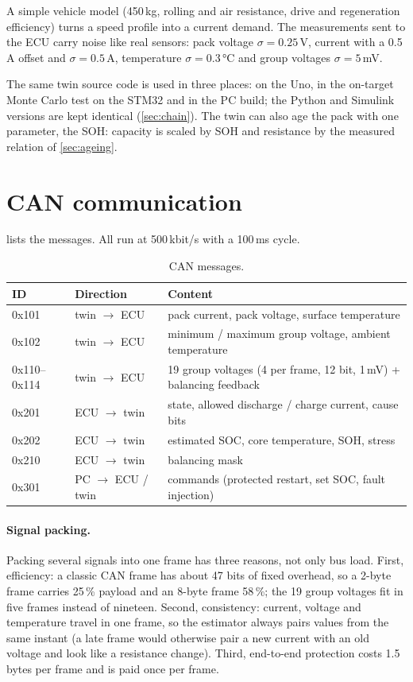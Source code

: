 A simple vehicle model (450\,kg, rolling and air resistance, drive and regeneration efficiency) turns a speed profile into a current demand. The measurements sent to the ECU carry noise like real sensors: pack voltage $\sigma = 0.25$\,V, current with a 0.5\,A offset and $\sigma = 0.5$\,A, temperature $\sigma = 0.3$\,°C and group voltages $\sigma = 5$\,mV.

The same twin source code is used in three places: on the Uno, in the on-target Monte Carlo test on the STM32 and in the PC build; the Python and Simulink versions are kept identical (\cref{sec:chain}). The twin can also age the pack with one parameter, the SOH: capacity is scaled by SOH and resistance by the measured relation of \cref{sec:ageing}.


\section{CAN communication}\label{sec:can}
 lists the messages. All run at 500\,kbit/s with a 100\,ms cycle.

\begin{table}[htbp]\centering\small
\caption{CAN messages.}\label{tab:can}
\begin{tabular}{@{}lll@{}}\toprule
ID & Direction & Content \\\midrule
0x101 & twin $\to$ ECU & pack current, pack voltage, surface temperature \\
0x102 & twin $\to$ ECU & minimum / maximum group voltage, ambient temperature \\
0x110--0x114 & twin $\to$ ECU & 19 group voltages (4 per frame, 12 bit, 1\,mV) + balancing feedback \\
0x201 & ECU $\to$ twin & state, allowed discharge / charge current, cause bits \\
0x202 & ECU $\to$ twin & estimated SOC, core temperature, SOH, stress \\
0x210 & ECU $\to$ twin & balancing mask \\
0x301 & PC $\to$ ECU / twin & commands (protected restart, set SOC, fault injection) \\\bottomrule
\end{tabular}
\end{table}

\paragraph{Signal packing.} Packing several signals into one frame has three reasons, not only bus load. First, efficiency: a classic CAN frame has about 47 bits of fixed overhead, so a 2-byte frame carries 25\,\% payload and an 8-byte frame 58\,\%; the 19 group voltages fit in five frames instead of nineteen. Second, consistency: current, voltage and temperature travel in one frame, so the estimator always pairs values from the same instant (a late frame would otherwise pair a new current with an old voltage and look like a resistance change). Third, end-to-end protection costs 1.5 bytes per frame and is paid once per frame.

